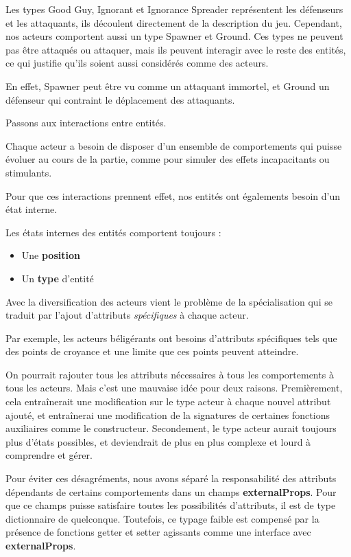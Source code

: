 \documentclass{article}
\begin{document}
Les types Good Guy, Ignorant et Ignorance Spreader représentent 
les défenseurs et les attaquants, ils découlent directement de la description du jeu.
Cependant, nos acteurs comportent aussi un type Spawner et Ground.
Ces types ne peuvent pas être attaqués ou attaquer, mais ils peuvent interagir avec le reste des entités, ce qui justifie qu'ils
soient aussi considérés comme des acteurs.

En effet, Spawner peut être vu comme un attaquant immortel, et Ground 
un défenseur qui contraint le déplacement des attaquants.

Passons aux interactions entre entités.

Chaque acteur a besoin de disposer d'un ensemble de comportements qui puisse évoluer 
au cours de la partie, comme pour simuler des effets incapacitants 
ou stimulants.

Pour que ces interactions prennent effet, nos entités ont 
égalements besoin d'un état interne.

Les états internes des entités comportent toujours :

\begin{itemize}
    \item Une \textbf{position}
    \item Un \textbf{type} d'entité
\end{itemize}

Avec la diversification des acteurs vient le problème de la spécialisation qui se traduit par l'ajout d'attributs \emph{spécifiques} à chaque acteur.

Par exemple, les acteurs béligérants ont besoins d'attributs spécifiques tels que des points de croyance et une limite que ces points peuvent atteindre.

On pourrait rajouter tous les attributs nécessaires à tous les comportements 
à tous les acteurs. Mais c'est une mauvaise idée pour deux raisons.
Premièrement, cela entraînerait une modification sur le type acteur à chaque nouvel attribut ajouté, et entraînerai une modification de la signatures de certaines fonctions auxiliaires comme le constructeur.
Secondement, le type acteur aurait toujours plus d'états possibles, 
et deviendrait de plus en plus complexe et lourd à comprendre et gérer.

Pour éviter ces désagréments, nous avons séparé la responsabilité des attributs 
dépendants de certains comportements dans un champs \textbf{externalProps}.
Pour que ce champs puisse satisfaire toutes les possibilités d'attributs, il
est de type dictionnaire de quelconque. Toutefois, ce typage faible est compensé 
par la présence de fonctions getter et setter agissants comme une interface 
avec \textbf{externalProps}.
\end{document}
